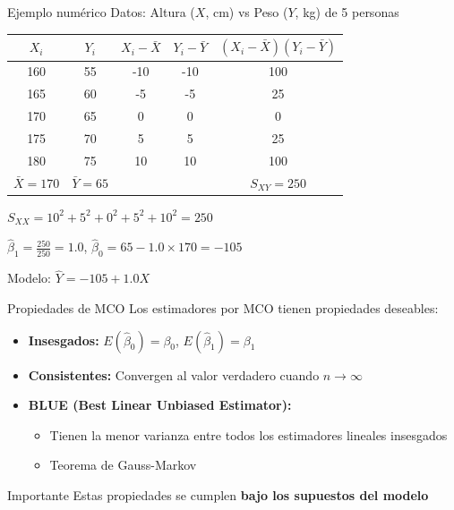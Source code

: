 \documentclass[aspectratio=169]{beamer}
\begin{document}
\begin{frame}{Ejemplo numérico}
Datos: Altura ($X$, cm) vs Peso ($Y$, kg) de 5 personas

\begin{table}
\centering
\begin{tabular}{ccccc}
\toprule
$X_i$ & $Y_i$ & $X_i - \bar{X}$ & $Y_i - \bar{Y}$ & $(X_i-\bar{X})(Y_i-\bar{Y})$ \\
\midrule
160 & 55 & -10 & -10 & 100 \\
165 & 60 & -5 & -5 & 25 \\
170 & 65 & 0 & 0 & 0 \\
175 & 70 & 5 & 5 & 25 \\
180 & 75 & 10 & 10 & 100 \\
\midrule
$\bar{X}=170$ & $\bar{Y}=65$ & & & $S_{XY}=250$ \\
\bottomrule
\end{tabular}
\end{table}

\vspace{0.3cm}
$S_{XX} = 10^2 + 5^2 + 0^2 + 5^2 + 10^2 = 250$

\vspace{0.3cm}
$\hat{\beta}_1 = \frac{250}{250} = 1.0$, \quad $\hat{\beta}_0 = 65 - 1.0 \times 170 = -105$

\vspace{0.3cm}
Modelo: $\hat{Y} = -105 + 1.0 X$
\end{frame}

\begin{frame}{Propiedades de MCO}
Los estimadores por MCO tienen propiedades deseables:

\begin{itemize}
    \item \textbf{Insesgados:} $E(\hat{\beta}_0) = \beta_0$, $E(\hat{\beta}_1) = \beta_1$
    \item \textbf{Consistentes:} Convergen al valor verdadero cuando $n \to \infty$
    \item \textbf{BLUE (Best Linear Unbiased Estimator):} 
    \begin{itemize}
        \item Tienen la menor varianza entre todos los estimadores lineales insesgados
        \item Teorema de Gauss-Markov
    \end{itemize}
\end{itemize}

\vspace{0.5cm}
\begin{alertblock}{Importante}
Estas propiedades se cumplen \textbf{bajo los supuestos del modelo}
\end{alertblock}
\end{frame}
\end{document}
